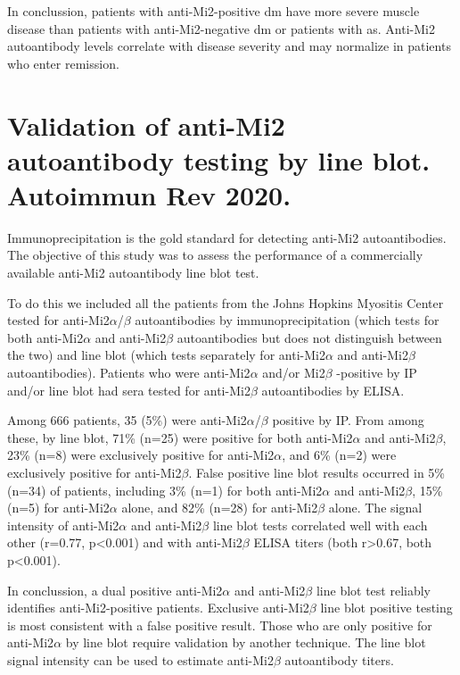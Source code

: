 In conclussion, patients with anti-Mi2-positive \gls{dm} have more severe muscle disease than patients with anti-Mi2-negative \gls{dm} or patients with \gls{as}. Anti-Mi2 autoantibody levels correlate with disease severity and may normalize in patients who enter remission.



\section{Validation of anti-Mi2 autoantibody testing by line blot. Autoimmun Rev 2020.}
\label{sec:mi2_serologic}

Immunoprecipitation is the gold standard for detecting anti-Mi2 autoantibodies. The objective of this study was to assess the performance of a commercially available anti-Mi2 autoantibody line blot test.

To do this we included all the patients from the Johns Hopkins Myositis Center tested for anti-Mi2$\alpha$/$\beta$ autoantibodies by immunoprecipitation (which tests for both anti-Mi2$\alpha$ and anti-Mi2$\beta$ autoantibodies but does not distinguish between the two) and line blot (which tests separately for anti-Mi2$\alpha$ and anti-Mi2$\beta$ autoantibodies).  Patients who were anti-Mi2$\alpha$ and/or Mi2$\beta$ -positive by IP and/or line blot had sera tested for anti-Mi2$\beta$  autoantibodies by ELISA.     

Among 666 patients, 35 (5\%) were anti-Mi2$\alpha$/$\beta$ positive by IP. From among these, by line blot, 71\% (n=25) were positive for both anti-Mi2$\alpha$ and anti-Mi2$\beta$, 23\% (n=8) were exclusively positive for anti-Mi2$\alpha$, and 6\% (n=2) were exclusively positive for anti-Mi2$\beta$.  False positive line blot results occurred in 5\% (n=34) of patients, including 3\% (n=1) for both anti-Mi2$\alpha$ and anti-Mi2$\beta$, 15\% (n=5) for anti-Mi2$\alpha$ alone, and 82\% (n=28) for anti-Mi2$\beta$ alone.  The signal intensity of anti-Mi2$\alpha$ and anti-Mi2$\beta$ line blot tests correlated well with each other (r=0.77, p<0.001) and with anti-Mi2$\beta$ ELISA titers (both r>0.67, both p<0.001).  

In conclussion, a dual positive anti-Mi2$\alpha$ and anti-Mi2$\beta$ line blot test reliably identifies anti-Mi2-positive patients. Exclusive anti-Mi2$\beta$ line blot positive testing is most consistent with a false positive result. Those who are only positive for anti-Mi2$\alpha$ by line blot require validation by another technique. The line blot signal intensity can be used to estimate anti-Mi2$\beta$ autoantibody titers.


